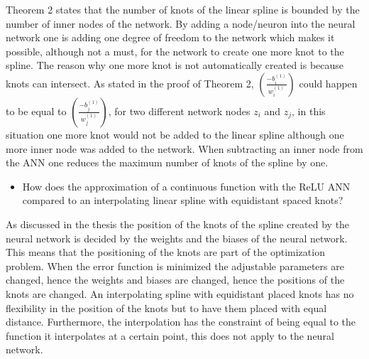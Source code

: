 \documentclass[11pt, letterpaper]{amsart}
\begin{document}
Theorem 2 states that the number of knots of the linear spline is bounded by the number of inner nodes of the network. By adding a node/neuron into the neural network one is adding one degree of freedom to the network which makes it possible, although not a must, for the network to create one more knot to the spline. The reason why one more knot is not automatically created is because knots can intersect. As stated in the proof of Theorem 2, $(\frac{-b_i^{(1)}}{w_i^{(1)}})$ could happen to be equal to $(\frac{-b_j^{(1)}}{w_j^{(1)}})$, for two different network nodes $z_i$ and $z_j$, in this situation one more knot would not be added to the linear spline although one more inner node was added to the network. When subtracting an inner node from the ANN one reduces the maximum number of knots of the spline by one.
\\

\begin{itemize}
\item How does the approximation of a continuous function with the ReLU ANN compared to an interpolating linear spline with equidistant spaced knots?
\end{itemize}
\vspace{0.5cm}

As discussed in the thesis the position of the knots of the spline created by the neural network is decided by the weights and the biases of the neural network. This means that the positioning of the knots are part of the optimization problem. When the error function is minimized the adjustable parameters are changed, hence the weights and biases are changed, hence the positions of the knots are changed. An interpolating spline with equidistant placed knots has no flexibility in the position of the knots but to have them placed with equal distance. Furthermore, the interpolation has the constraint of being equal to the function it interpolates at a certain point, this does not apply to the neural network.
\end{document}
